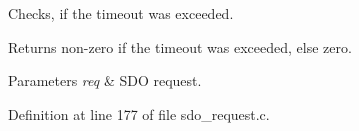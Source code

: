 \-Checks, if the timeout was exceeded. 

\begin{DoxyReturn}{\-Returns}
non-\/zero if the timeout was exceeded, else zero. 
\end{DoxyReturn}

\begin{DoxyParams}{\-Parameters}
{\em req} & \-S\-D\-O request. \\
\hline
\end{DoxyParams}


\-Definition at line 177 of file sdo\-\_\-request.\-c.


